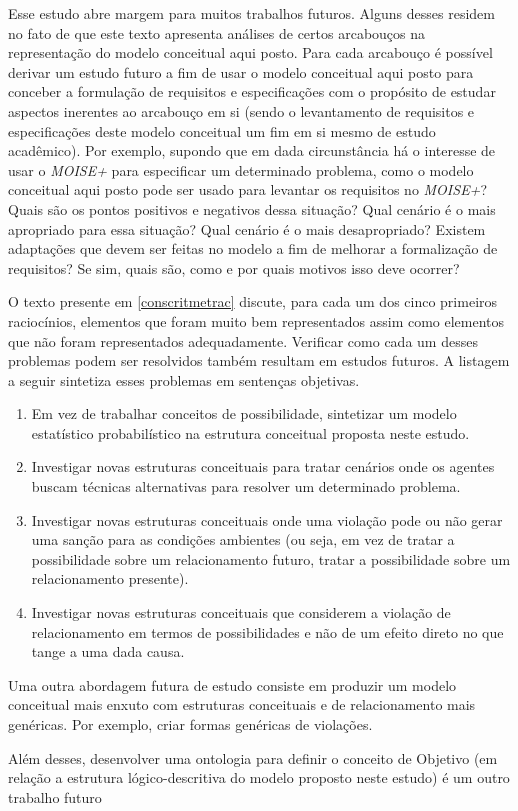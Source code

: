 Esse estudo abre margem para muitos trabalhos futuros. Alguns desses residem no fato de que este texto apresenta análises de certos arcabouços na representação do modelo conceitual aqui posto. Para cada arcabouço é possível derivar um estudo futuro a fim de usar o modelo conceitual aqui posto para conceber a formulação de requisitos e especificações com o propósito de estudar aspectos inerentes ao arcabouço em si (sendo o levantamento de requisitos e especificações deste modelo conceitual um fim em si mesmo de estudo acadêmico). Por exemplo, supondo que em dada circunstância há o interesse de usar o \textit{MOISE+} para especificar um determinado problema, como o modelo conceitual aqui posto pode ser usado para levantar os requisitos no \textit{MOISE+}? Quais são os pontos positivos e negativos dessa situação? Qual cenário é o mais apropriado para essa situação? Qual cenário é o mais desapropriado? Existem adaptações que devem ser feitas no modelo a fim de melhorar a formalização de requisitos? Se sim, quais são, como e por quais motivos isso deve ocorrer? 

O texto presente em \ref{conscritmetrac} discute, para cada um dos cinco primeiros raciocínios, elementos que foram muito bem representados assim como elementos que não foram representados adequadamente. Verificar como cada um desses problemas podem ser resolvidos também resultam em estudos futuros. A listagem a seguir sintetiza esses problemas em sentenças objetivas. 

\begin{enumerate}
    \item Em vez de trabalhar conceitos de possibilidade, sintetizar um modelo estatístico probabilístico na estrutura conceitual proposta neste estudo.
    \item Investigar novas estruturas conceituais para tratar cenários onde os agentes buscam técnicas alternativas para resolver um determinado problema. 
    \item Investigar novas estruturas conceituais onde uma violação pode ou não gerar uma sanção para as condições ambientes (ou seja, em vez de tratar a possibilidade sobre um relacionamento futuro, tratar a possibilidade sobre um relacionamento presente).
    \item Investigar novas estruturas conceituais que considerem a violação de relacionamento em termos de possibilidades e não de um efeito direto no que tange a uma dada causa.   
\end{enumerate}

Uma outra abordagem futura de estudo consiste em produzir um modelo conceitual mais enxuto com estruturas conceituais e de relacionamento mais genéricas. Por exemplo, criar formas genéricas de violações.

Além desses, desenvolver uma ontologia para definir o conceito de Objetivo (em relação a estrutura lógico-descritiva do modelo proposto neste estudo) é um outro trabalho futuro